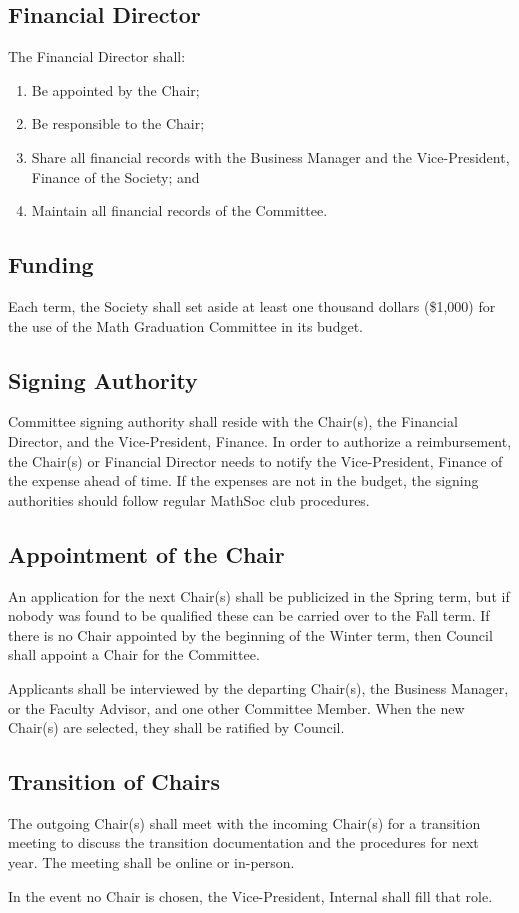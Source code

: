 \subsection{Financial Director}
The Financial Director shall:
\begin{enumerate}
\item Be appointed by the Chair;
\item Be responsible to the Chair;
\item Share all financial records with the Business Manager and the Vice-President, Finance of the Society; and
\item Maintain all financial records of the Committee.
\end{enumerate}

\subsection{Funding}
Each term, the Society shall set aside at least one thousand dollars (\$1,000) for the use of the Math Graduation Committee in its budget.

\subsection{Signing Authority}
Committee signing authority shall reside with the Chair(s), the Financial Director, 
and the Vice-President, Finance. In order to authorize a reimbursement, the Chair(s) 
or Financial Director needs to notify the Vice-President, Finance of the expense 
ahead of time. If the expenses are not in the budget, the signing authorities should 
follow regular MathSoc club procedures. 

\subsection{Appointment of the Chair}
An application for the next Chair(s) shall be publicized in the Spring term, but if 
nobody was found to be qualified these can be carried over to the Fall term. If there 
is no Chair appointed by the beginning of the Winter term, then Council shall appoint 
a Chair for the Committee.

Applicants shall be interviewed by the departing Chair(s), the Business Manager, 
or the Faculty Advisor, and one other Committee Member.
When the new Chair(s) are selected, they shall be ratified by Council.

\subsection{Transition of Chairs}
The outgoing Chair(s) shall meet with the incoming Chair(s) for a transition 
meeting to discuss the transition documentation and the procedures for next year. The 
meeting shall be online or in-person.

In the event no Chair is chosen, the Vice-President, Internal shall fill that role.
